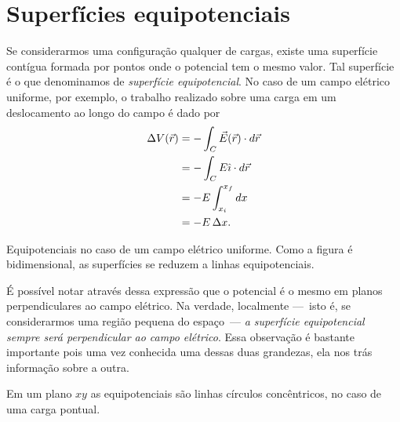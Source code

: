 \section{Superfícies equipotenciais}

Se considerarmos uma configuração qualquer de cargas, existe uma superfície contígua formada por pontos onde o potencial tem o mesmo valor. Tal superfície é o que denominamos de \emph{superfície equipotencial}. No caso de um campo elétrico uniforme, por exemplo, o trabalho realizado sobre uma carga em um deslocamento ao longo do campo é dado por
\begin{align}
    \Delta V(\vec{r}) &= - \int_C \vec{E}(\vec{r}) \cdot d\vec{r} \\
    &= - \int_C E \hat{\imath} \cdot d\vec{r} \\
    &= - E \int_{x_i}^{x_f} dx \\
    &= - E \, \Delta x.
\end{align}

\begin{marginfigure}
\centering
{}
\caption{Equipotenciais no caso de um campo elétrico uniforme. Como a figura é bidimensional, as superfícies se reduzem a linhas equipotenciais.}
\end{marginfigure}
%
\noindent{}É possível notar através dessa expressão que o potencial é o mesmo em planos perpendiculares ao campo elétrico. Na verdade, localmente ---~isto é, se considerarmos uma região pequena do espaço~--- \emph{a superfície equipotencial sempre será perpendicular ao campo elétrico}. Essa observação é bastante importante pois uma vez conhecida uma dessas duas grandezas, ela nos trás informação sobre a outra.
    
\begin{marginfigure}
\caption{Em um plano $xy$ as equipotenciais são linhas círculos concêntricos, no caso de uma carga pontual.\label{Fig:EquipotenciaisCargaPontualXY}}
\end{marginfigure}

